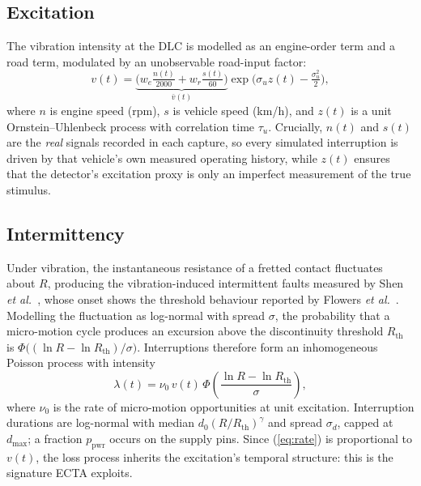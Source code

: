 \subsection{Excitation}
The vibration intensity at the DLC is modelled as an engine-order term and
a road term, modulated by an unobservable road-input factor:
\begin{equation}
v(t)=\underbrace{\Big(w_e\tfrac{n(t)}{2000}+w_r\tfrac{s(t)}{60}\Big)}_{\bar v(t)}
\exp\!\Big(\sigma_u z(t)-\tfrac{\sigma_u^2}{2}\Big),
\label{eq:vib}
\end{equation}
where $n$ is engine speed (rpm), $s$ is vehicle speed (km/h), and $z(t)$
is a unit Ornstein--Uhlenbeck process with correlation time $\tau_u$.
Crucially, $n(t)$ and $s(t)$ are the \emph{real} signals recorded in each
capture, so every simulated interruption is driven by that vehicle's own
measured operating history, while $z(t)$ ensures that the detector's
excitation proxy is only an imperfect measurement of the true stimulus.

\subsection{Intermittency}
Under vibration, the instantaneous resistance of a fretted contact
fluctuates about $R$, producing the vibration-induced intermittent faults
measured by Shen \emph{et al.}~\cite{shen2018tcpmt}, whose onset shows the
threshold behaviour reported by Flowers \emph{et al.}~\cite{flowers2004}. Modelling the fluctuation as log-normal with spread
$\sigma$, the probability that a micro-motion cycle produces an excursion
above the discontinuity threshold $R_{\mathrm{th}}$~\cite{uscar2} is
$\Phi\big((\ln R-\ln R_{\mathrm{th}})/\sigma\big)$. Interruptions therefore
form an inhomogeneous Poisson process with intensity
\begin{equation}
\lambda(t)=\nu_0\, v(t)\,
\Phi\!\left(\frac{\ln R-\ln R_{\mathrm{th}}}{\sigma}\right),
\label{eq:rate}
\end{equation}
where $\nu_0$ is the rate of micro-motion opportunities at unit
excitation. Interruption durations are log-normal with median
$d_0 (R/R_{\mathrm{th}})^{\gamma}$ and spread $\sigma_d$, capped at
$d_{\max}$; a fraction $p_{\mathrm{pwr}}$ occurs on the supply pins. Since
(\ref{eq:rate}) is proportional to $v(t)$, the loss process inherits the
excitation's temporal structure: this is the signature ECTA exploits.

